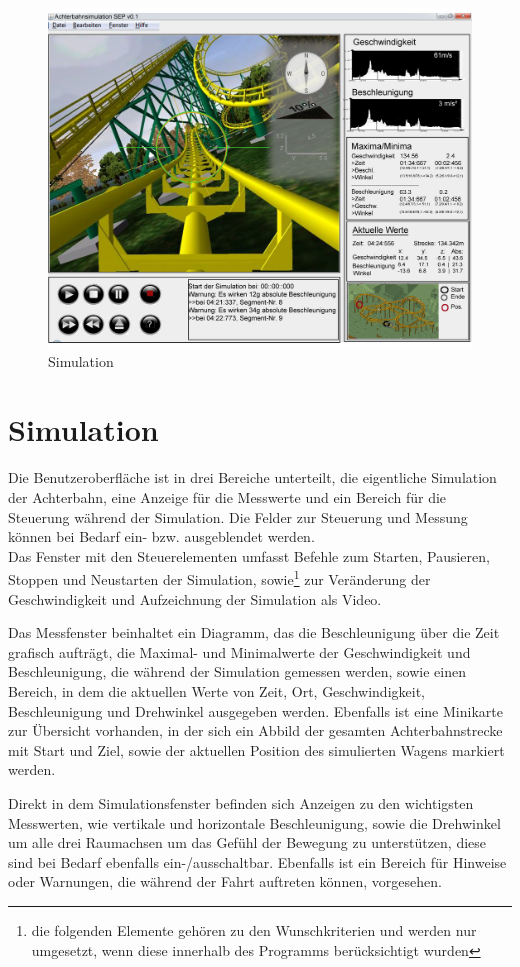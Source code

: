 \begin{figure}[!h]%
\includegraphics[width=0.8\linewidth]{./bilder/GUI_v2.jpg}%
\caption{Simulation}%
\label{Simulation}%
\end{figure}
\section*{Simulation}

Die Benutzeroberfläche ist in drei Bereiche unterteilt, die eigentliche Simulation der Achterbahn, eine Anzeige für die Messwerte und ein Bereich für die Steuerung während der Simulation. Die Felder zur Steuerung und Messung können bei Bedarf ein- bzw. ausgeblendet werden.\\
Das Fenster mit den Steuerelementen umfasst Befehle zum Starten, Pausieren, Stoppen und Neustarten der Simulation, sowie\footnote{die folgenden Elemente gehören zu den Wunschkriterien und werden nur umgesetzt, wenn diese innerhalb des Programms berücksichtigt wurden} zur Veränderung der Geschwindigkeit und Aufzeichnung der Simulation als Video.

Das Messfenster beinhaltet ein Diagramm, das die Beschleunigung über die Zeit grafisch aufträgt, die Maximal- und Minimalwerte der Geschwindigkeit und Beschleunigung, die während der Simulation gemessen werden, sowie einen Bereich, in dem die aktuellen Werte von Zeit, Ort, Geschwindigkeit, Beschleunigung und Drehwinkel ausgegeben werden.
Ebenfalls ist eine Minikarte zur Übersicht vorhanden, in der sich ein Abbild der gesamten Achterbahnstrecke mit Start und Ziel, sowie der aktuellen Position des simulierten Wagens markiert werden.

Direkt in dem Simulationsfenster befinden sich Anzeigen zu den wichtigsten Messwerten, wie vertikale und horizontale Beschleunigung, sowie die Drehwinkel um alle drei Raumachsen um das Gefühl der Bewegung zu unterstützen, diese sind bei Bedarf ebenfalls ein-/ausschaltbar. Ebenfalls ist ein Bereich für Hinweise oder Warnungen, die während der Fahrt auftreten können, vorgesehen. 


